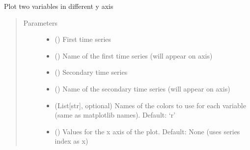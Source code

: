 \documentclass[letterpaper,10pt,english]{sphinxmanual}
\begin{document}
\begin{fulllineitems}

\begin{fulllineitems}
\label{\detokenize{plots:plots.Plots.twinx_canvas}}
\sphinxAtStartPar
Plot two variables in different y axis
\begin{quote}\begin{description}
\item[{Parameters}] \leavevmode\begin{itemize}
\item {} 
\sphinxAtStartPar
{} () \textendash{} First time series

\item {} 
\sphinxAtStartPar
{} () \textendash{} Name of the first time series (will appear on axis)

\item {} 
\sphinxAtStartPar
{} () \textendash{} Secondary time series

\item {} 
\sphinxAtStartPar
{} () \textendash{} Name of the secondary time series (will appear on axis)

\item {} 
\sphinxAtStartPar
{} ({\color{red}\bfseries{}\textasciigrave{}}List{[}str{]}, optional) \textendash{} Names of the colors to use for each variable (same as matplotlib names). Default: ‘r’

\item {} 
\sphinxAtStartPar
{} (\sphinxstyleliteralemphasis{\sphinxupquote{, }}) \textendash{} Values for the x axis of the plot. Default: None (uses series index as x)


\end{itemize}
\end{description}
\end{quote}
\end{fulllineitems}
\end{fulllineitems}
\end{document}
